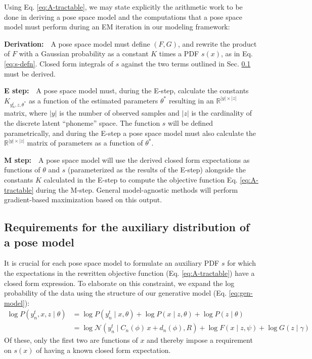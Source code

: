 \documentclass{article}         %
\newcommand{\RR}{\mathbb{R}}
\newcommand{\NN}{\mathcal{N}}
\begin{document}
Using Eq. \ref{eq:A-tractable}, we may state explicitly the arithmetic work to be done in deriving a pose space model and the computations that a pose space model must perform during an EM iteration in our modeling framework:

\textbf{Derivation:}\ \ A pose space model must define $(F, G)$, and rewrite the product of $F$ with a Gaussian probability as a constant $K$ times a PDF $s(x)$, as in Eq. \ref{eq:s-defn}. Closed form integrals of $s$ against the two terms outlined in Sec. \ref{sec:s} must be derived.

\textbf{E step:}\ \  A pose space model must, during the E-step, calculate the constants $K_{y_n^t,z,\theta^*}$ as a function of the estimated parameters $\theta^*$ resulting in an $\RR^{|y|\times |z|}$ matrix, where $|y|$ is the number of observed samples and $|z|$ is the cardinality of the discrete latent ``phoneme'' space. The function $s$ will be defined parametrically, and during the E-step a pose space model must also calculate the $\RR^{|y|\times |z|}$ matrix of parameters as a function of $\theta^*$.

\textbf{M step:}\ \ A pose space model will use the derived closed form expectations as functions of $\theta$ and $s$ (parameterized as the results of the E-step) alongside the constants $K$ calculated in the E-step to compute the objective function Eq. \ref{eq:A-tractable} during the M-step. General model-agnostic methods will perform gradient-based maximization based on this output.

\subsection{Requirements for the auxiliary distribution of a pose model}
\label{sec:s}

It is crucial for each pose space model to formulate an auxiliary PDF $s$ for which the expectations in the rewritten objective function (Eq. \ref{eq:A-tractable}) have a closed form expression. To elaborate on this constraint, we expand the log probability of the data using the structure of our generative model (Eq. \ref{eq:gen-model}): 
\begin{align}
    \log P(y^t_n, x, z \mid \theta) &= \log P(y^t_n \mid x, \theta) + \log P(x\mid z, \theta) + \log P(z\mid \theta) \\
    &= \log \NN(y^t_n \mid C_n(\phi)\, x + d_n(\phi), R) + \log F(x\mid z,\psi) + \log G(z \mid \gamma)
    \label{eq:logprob-terms}
\end{align}
Of these, only the first two are functions of $x$ and thereby impose a requirement on $s(x)$ of having a known closed form expectation.
\end{document}
